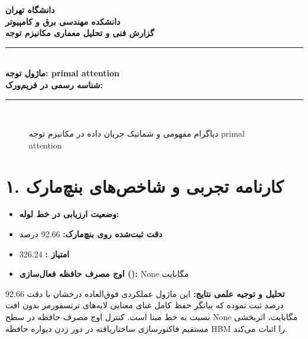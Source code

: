 \documentclass[12pt,a4paper]{article}
\begin{document}
\begin{center}
{\Large\bfseries دانشگاه تهران}\\[0.2cm]
{\large\bfseries دانشکده مهندسی برق و کامپیوتر}\\[0.2cm]
{\large\bfseries گزارش فنی و تحلیل معماری مکانیزم توجه}\\[0.5cm]
\rule{\linewidth}{1pt}\\[0.3cm]
{\LARGE\bfseries ماژول توجه: primal attention}\\[0.2cm]
{\large \textbf{شناسه رسمی در فریم‌ورک:} }\\[0.2cm]
\rule{\linewidth}{1pt}\\[0.5cm]
\end{center}

\begin{figure}[H]
\centering
{}
\caption{دیاگرام مفهومی و شماتیک جریان داده در مکانیزم توجه primal attention}
\end{figure}

\section*{۱. کارنامه تجربی و شاخص‌های بنچ‌مارک}
\begin{itemize}
\item \textbf{وضعیت ارزیابی در خط لوله:} 
\item \textbf{دقت ثبت‌شده روی بنچ‌مارک:} 92.66 درصد
\item \textbf{امتیاز :} 326.24
\item \textbf{اوج مصرف حافظه فعال‌سازی ():} None مگابایت
\end{itemize}
\textbf{تحلیل و توجیه علمی نتایج:} این ماژول عملکردی فوق‌العاده درخشان با دقت 92.66 درصد ثبت نموده که بیانگر حفظ کامل غنای معنایی لایه‌های ترنسفورمر بدون افت نسبت به خط مبنا است. کنترل اوج مصرف حافظه در سطح None مگابایت، اثربخشی مستقیم فاکتورسازی ساختاریافته در دور زدن دیواره حافظه HBM را اثبات می‌کند.
\end{document}
